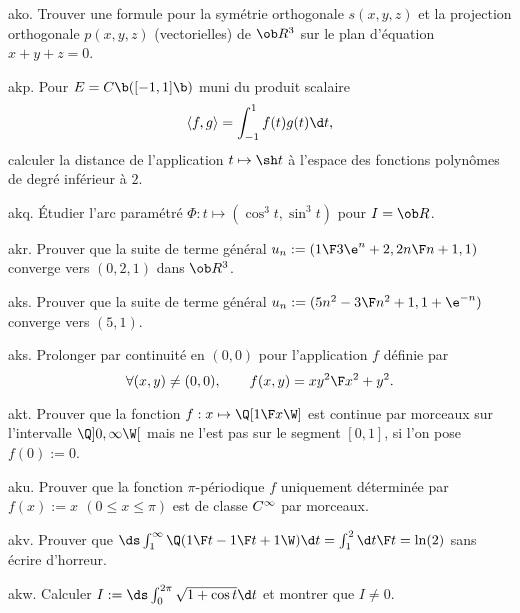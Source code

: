 
\exo [Origin=\Lakedaemon,Level=2,Fight=1,Learn=1,Type=\TravauxDirigés,Field=\Orthonormalisation] ako. 
Trouver une formule pour la symétrie orthogonale $s(x,y,z)$ et la projection orthogonale $p(x,y,z)$ (vectorielles) de $\ob R^3$ sur le plan d'équation $x+y+z=0$. 

\exo [Origin=\Lakedaemon,Level=2,Fight=1,Learn=1,Type=\Exercices,Field=\Orthonormalisation] akp. 
Pour $E=\sc C\b([-1,1]\b)$ muni du produit scalaire 
$$
\langle f,g\rangle=\int_{-1}^1f(t)g(t)\d t,
$$ 
calculer la distance de l'application $t\mapsto \sh t$ à l'espace des fonctions polynômes de degré inférieur à $2$. 

\exo [Origin=\Lakedaemon,Level=2,Fight=1,Learn=1,Type=\Cours,Field=\Courbes] akq. 
\'Etudier l'arc paramétré $\Phi:t\mapsto(\cos^3t,\sin^3t)$ pour $I=\ob R$. 

\exo [Origin=\Lakedaemon,Level=1,Fight=0,Learn=0,Type=\Cours,Field=\Suites] akr. 
Prouver que la suite de terme général $u_n:=({1\F 3\e^n+2}, {2n\F n+1}, 1)$ converge vers $(0,2,1)$ dans $\ob R^3$. 

\exo [Origin=\Lakedaemon,Level=1,Fight=0,Learn=0,Type=\Cours,Field=\Suites] aks. 
Prouver que la suite de terme général $u_n:=({5n^2-3\F n^2+1},1+\e^{-n})$ converge vers $(5,1)$. 

\exo [Origin=\Lakedaemon,Level=2,Fight=1,Learn=1,Type=\Exercices,Field=\FonctionsDePlusieursVariables] aks. 
Prolonger par continuité en $(0,0)$ pour l'application $f$ définie par 
$$
\forall (x,y)\neq(0,0), \qquad f(x,y)={xy^2\F x^2+y^2}. 
$$

\exo [Origin=\Lakedaemon,Level=2,Fight=0,Learn=0,Type=\Cours,Field=\Fonctions] akt. 
Prouver que la fonction $f:x\mapsto \Q[{1\F x}\W]$ est continue par morceaux sur l'intervalle $\Q]0, \infty\W[$ mais ne l'est pas sur le segment $[0, 1]$, si l'on pose $f(0):=0$.  

\exo [Origin=\Lakedaemon,Level=2,Fight=0,Learn=0,Type=\Cours,Field=\Fonctions] aku. 
Prouver que la fonction $\pi$-périodique $f$ uniquement déterminée par $f(x):=x\ \,(0\le x\le \pi)$ est de classe $\sc C^\infty$ par morceaux.  

\exo [Origin=\Lakedaemon,Level=2,Fight=1,Learn=1,Type=\Exercices,Field=\IntégralesGénéralisées] akv. 
Prouver que $\ds \int_1^\infty\Q({1\F t}-{1\F t+1}\W)\d t=\int_1^2{\d t\F t}=\ln(2)$ sans écrire d'horreur. 

\exo [Origin=\Lakedaemon,Level=2,Fight=1,Learn=1,Type=\Exercices,Field=\IntégralesGénéralisées] akw. 
Calculer $I:=\ds\int_0^{2\pi}\sqrt{1+\cos t}\d t$ et montrer que $I\neq 0$. 

